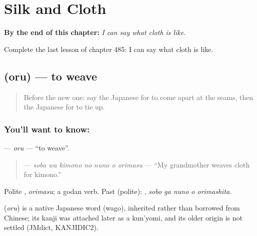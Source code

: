 
\chapter{Silk and Cloth}
\label{ch:ja-silk-and-cloth}

\begin{chapteropening}
\textbf{By the end of this chapter:} \emph{I can say what cloth is like.}

Complete the last lesson of chapter 485: I can say what cloth is like.
\end{chapteropening}

\section[\texorpdfstring{\ja{おる} (oru)}{おる (oru)}]{ (oru) — to weave}

\label{lesson:JA-C485-oru}



\begin{quote}
Before the new one: say the Japanese for to come apart at the seams, then the Japanese for to tie up.
\end{quote}

\subsection*{You'll want to know: }
\textbf{} — \emph{oru} — \textquotedblleft{}to weave\textquotedblright{}.

\begin{quote}
\textbf{   } — \emph{sobo wa kimono no nuno o orimasu} — \textquotedblleft{}My grandmother weaves cloth for kimono.\textquotedblright{}
\end{quote}

Polite \textbf{}, \emph{orimasu}; a godan verb. Past (polite): \textbf{  }, \emph{sobo ga nuno o orimashita}.

\begin{cousinweb}
\textbf{} (\emph{oru}) is a native Japanese word (wago), inherited rather than borrowed from Chinese; its kanji was attached later as a kun'yomi, and its older origin is not settled (JMdict, KANJIDIC2).
\end{cousinweb}

